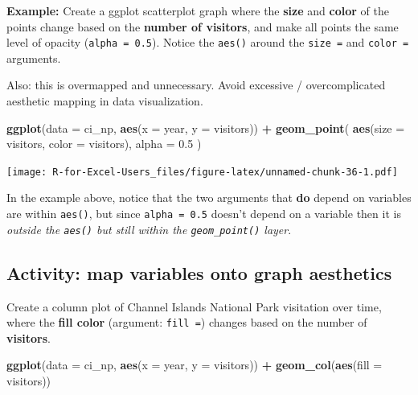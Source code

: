 \documentclass[]{book}
\newenvironment{Shaded}{\begin{snugshade}}{\end{snugshade}}
\newcommand{\DataTypeTok}[1]{\textcolor[rgb]{0.13,0.29,0.53}{#1}}
\newcommand{\FloatTok}[1]{\textcolor[rgb]{0.00,0.00,0.81}{#1}}
\newcommand{\KeywordTok}[1]{\textcolor[rgb]{0.13,0.29,0.53}{\textbf{#1}}}
\newcommand{\NormalTok}[1]{#1}
\newcommand{\OperatorTok}[1]{\textcolor[rgb]{0.81,0.36,0.00}{\textbf{#1}}}
\newcommand{\StringTok}[1]{\textcolor[rgb]{0.31,0.60,0.02}{#1}}
\begin{document}
\textbf{Example:} Create a ggplot scatterplot graph where the \textbf{size} and \textbf{color} of the points change based on the \textbf{number of visitors}, and make all points the same level of opacity (\texttt{alpha\ =\ 0.5}). Notice the \texttt{aes()} around the \texttt{size\ =} and \texttt{color\ =} arguments.

Also: this is overmapped and unnecessary. Avoid excessive / overcomplicated aesthetic mapping in data visualization.

\begin{Shaded}
\begin{Highlighting}[]
\KeywordTok{ggplot}\NormalTok{(}\DataTypeTok{data =}\NormalTok{ ci_np, }\KeywordTok{aes}\NormalTok{(}\DataTypeTok{x =}\NormalTok{ year, }\DataTypeTok{y =}\NormalTok{ visitors)) }\OperatorTok{+}
\StringTok{  }\KeywordTok{geom_point}\NormalTok{(}
    \KeywordTok{aes}\NormalTok{(}\DataTypeTok{size =}\NormalTok{ visitors,}
        \DataTypeTok{color =}\NormalTok{ visitors),}
    \DataTypeTok{alpha =} \FloatTok{0.5}
\NormalTok{  )}
\end{Highlighting}
\end{Shaded}

\texttt{[image: R-for-Excel-Users\_files/figure-latex/unnamed-chunk-36-1.pdf]}

In the example above, notice that the two arguments that \textbf{do} depend on variables are within \texttt{aes()}, but since \texttt{alpha\ =\ 0.5} doesn't depend on a variable then it is \emph{outside the \texttt{aes()} but still within the \texttt{geom\_point()} layer}.

\hypertarget{activity-map-variables-onto-graph-aesthetics}{%
\subsection{Activity: map variables onto graph aesthetics}\label{activity-map-variables-onto-graph-aesthetics}}

Create a column plot of Channel Islands National Park visitation over time, where the \textbf{fill color} (argument: \texttt{fill\ =}) changes based on the number of \textbf{visitors}.

\begin{Shaded}
\begin{Highlighting}[]
\KeywordTok{ggplot}\NormalTok{(}\DataTypeTok{data =}\NormalTok{ ci_np, }\KeywordTok{aes}\NormalTok{(}\DataTypeTok{x =}\NormalTok{ year, }\DataTypeTok{y =}\NormalTok{ visitors)) }\OperatorTok{+}
\StringTok{  }\KeywordTok{geom_col}\NormalTok{(}\KeywordTok{aes}\NormalTok{(}\DataTypeTok{fill =}\NormalTok{ visitors))}
\end{Highlighting}
\end{Shaded}
\end{document}
